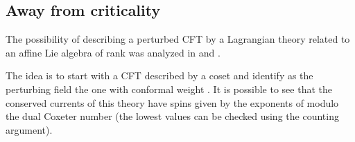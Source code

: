 \documentclass[a4paper,12pt]{report}
\begin{document}
\subsection{Away from criticality}

The possibility of describing a perturbed CFT by a Lagrangian theory related to an affine Lie algebra \coordHE{}
of rank \coordHE{} was analyzed in \cite{egyang} and \cite{hollmansf}.

The idea is to start with a CFT described by a coset \coordHE{} and identify as
the perturbing field \myHighlight{$\Phi$}\coordHE{} the one with conformal weight \coordHE{}. It is possible to see
that the conserved currents of this theory have spins given by the exponents of \coordHE{} modulo the dual Coxeter
number \coordHE{} (the lowest values can be checked using the counting argument).
\end{document}
